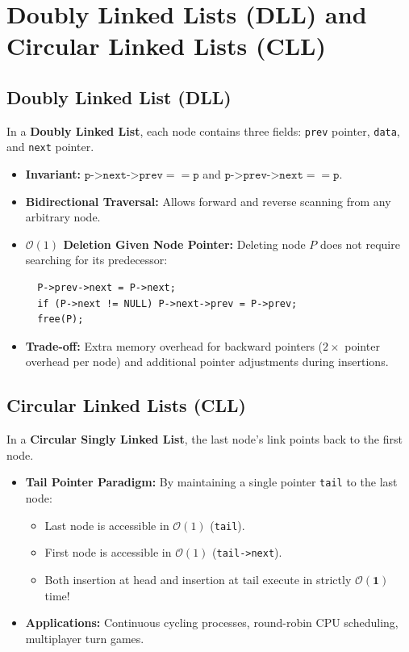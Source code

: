 \documentclass[12pt,a4paper]{article}
\begin{document}
\section{Doubly Linked Lists (DLL) and Circular Linked Lists (CLL)}

\subsection{Doubly Linked List (DLL)}
In a \textbf{Doubly Linked List}, each node contains three fields: \texttt{prev} pointer, \texttt{data}, and \texttt{next} pointer.
\par\vspace{4pt}
\begin{itemize}[leftmargin=*, itemsep=3pt]
  \item \textbf{Invariant:} $\texttt{p->next->prev} == \texttt{p}$ and $\texttt{p->prev->next} == \texttt{p}$.
  \item \textbf{Bidirectional Traversal:} Allows forward and reverse scanning from any arbitrary node.
  \item \textbf{$\mathcal{O}(1)$ Deletion Given Node Pointer:} Deleting node $P$ does not require searching for its predecessor:
  \begin{verbatim}
  P->prev->next = P->next;
  if (P->next != NULL) P->next->prev = P->prev;
  free(P);
  \end{verbatim}
  \item \textbf{Trade-off:} Extra memory overhead for backward pointers ($2\times$ pointer overhead per node) and additional pointer adjustments during insertions.
\end{itemize}

\subsection{Circular Linked Lists (CLL)}
In a \textbf{Circular Singly Linked List}, the last node's link points back to the first node.
\par\vspace{3pt}
\begin{itemize}[leftmargin=*, itemsep=3pt]
  \item \textbf{Tail Pointer Paradigm:} By maintaining a single pointer \texttt{tail} to the last node:
  \begin{itemize}[leftmargin=*, nosep]
    \item Last node is accessible in $\mathcal{O}(1)$ (\texttt{tail}).
    \item First node is accessible in $\mathcal{O}(1)$ (\texttt{tail->next}).
    \item Both insertion at head and insertion at tail execute in strictly $\mathbf{\mathcal{O}(1)}$ time!
  \end{itemize}
  \item \textbf{Applications:} Continuous cycling processes, round-robin CPU scheduling, multiplayer turn games.
\end{itemize}
\end{document}
